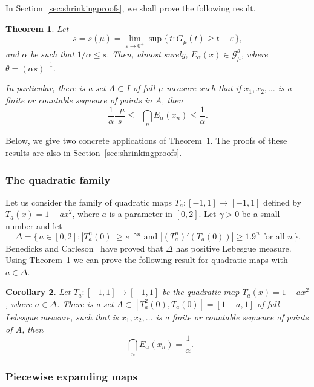 \documentclass[11pt]{article}
\newtheorem{theo}{Theorem}[section]
\newtheorem{coro}[theo]{Corollary}
\theoremstyle{definition}
\numberwithin{equation}{section}
\numberwithin{figure}{section}
\numberwithin{table}{section}
\DeclareMathOperator{\dimh}{dim_H}
\DeclareMathOperator{\udimh}{\overline{dim}_H}
\begin{document}
In Section~\ref{sec:shrinkingproofs}, we shall prove the following result.

\begin{theo}\label{the:shrinking}
Let
\[
s = s (\mu) = \lim_{\varepsilon \to 0^+} \sup \{\, t : G_\mu (t)
\geq t - \varepsilon \,\},
\]
and $\alpha$ be such that $1/\alpha \leq s$. Then, almost surely, $E_\alpha (x) \in \mathscr{G}_\mu^\theta$, where $\theta = (\alpha s)^{-1}$.

In particular, there is a set $A \subset I$ of full $\mu$ measure such that if $x_1, x_2, \ldots$ is a finite or countable sequence of points in $A$, then
\[
\frac{1}{\alpha} \frac{\udimh \mu}{s} \leq \dimh \bigcap_n E_\alpha (x_n) \leq \frac{1}{\alpha}.
\]
\end{theo}

Below, we give two concrete applications of Theorem~\ref{the:shrinking}. The proofs of these results are also in Section~\ref{sec:shrinkingproofs}.

\subsubsection{The quadratic family} \label{sec:quadratic}

Let us consider the family of quadratic maps $T_a \colon [-1,1] \to [-1,1]$ defined by $T_a (x) = 1 - a x^2$, where $a$ is a parameter in $[0,2]$. Let $\gamma > 0$ be a small number and let
\[
\Delta = \{\, a \in [0, 2] : |T_a^n (0)| \geq e^{-\gamma n} \text{ and } |(T_a^n)' (T_a(0)) | \geq 1.9^n \text{ for all } n \,\}.
\]
Benedicks and Carleson~\cite{benedickscarleson} have proved that $\Delta$ has positive Lebesgue measure. Using Theorem~\ref{the:shrinking} we can prove the following result for quadratic maps with $a \in \Delta$.

\begin{coro}\label{cor:quadratic}
Let $T_a \colon [-1,1] \to [-1,1]$ be the quadratic map $T_a (x) = 1 - a x^2$, where $a \in \Delta$. There is a set $A \subset [T_a^2 (0), T_a (0)] = [1-a,1]$ of full Lebesgue measure, such that is $x_1, x_2, \ldots$ is a finite or countable sequence of points of\/ $A$, then
\[
\dimh \bigcap_n E_\alpha (x_n) = \frac{1}{\alpha}.
\]
\end{coro}


\subsubsection{Piecewise expanding maps} \label{sec:piecewise}
\end{document}
